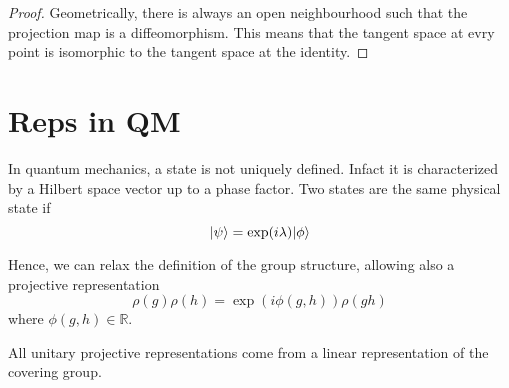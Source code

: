     \begin{proof}
        Geometrically, there is always an open neighbourhood such that the projection map is a diffeomorphism. This means that the tangent space at evry point is isomorphic to the tangent space at the identity.
    \end{proof}

\section{Reps in QM}

    In quantum mechanics, a state is not uniquely defined. Infact it is characterized by a Hilbert space vector up to a phase factor. Two states are the same physical state if 
    \begin{equation*}
        \vert\psi\rangle = \exp(i \lambda) \vert\phi\rangle
    \end{equation*}

    Hence, we can relax the definition of the group structure, allowing also a projective representation
    \begin{equation*}
        \rho(g) \rho(h) = \exp(i \phi(g, h)) \rho(gh)
    \end{equation*}
    where $\phi(g, h) \in \mathbb R$. 

    All unitary projective representations come from a linear representation of the covering group. 
